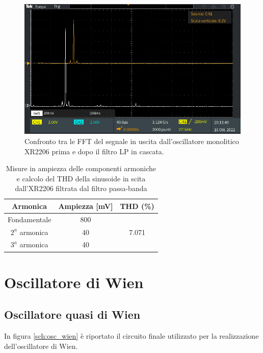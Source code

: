 \documentclass[titlepage]{report}
\begin{document}
	\begin{figure}[H]
		\centering
		\includegraphics[scale=0.5]{Immagini/fft_xr+lp.PNG}
		\caption{Confronto tra le FFT del segnale in uscita dall'oscillatore monolitico XR2206 prima e dopo il filtro LP in cascata.}
		\label{fig:FFTxr+LP}
	\end{figure}


	\begin{table}[h!]
		\centering
		\begin{tabular}{||c|c|c||}
			\hline
			\cellcolor{gray!10}Armonica & \cellcolor{gray!10}Ampiezza [mV] & \cellcolor{gray!10}THD (\%) \\
			\hline
			Fondamentale & 800 &\\
			\cline{1-2}
			$2^a$ armonica & 40 & 7.071 \\
			\cline{1-2} 
			$3^a$ armonica & 40 & \\
			\hline	
		\end{tabular}
		\caption{Misure in ampiezza delle componenti armoniche e calcolo del THD della sinusoide in scita dall'XR2206 filtrata dal filtro passa-banda}
		\label{tab:THD_XR2206+BP}
	\end{table}

\newpage
\section{Oscillatore di Wien}
\label{sc: oscillatore wien sperimentale}

	\subsection{Oscillatore quasi di Wien}
	\label{subsc: wien sbagliato}

	In figura \ref{sch:osc_wien} è riportato il circuito finale utilizzato per la realizzazione dell'oscillatore di Wien.
\end{document}
